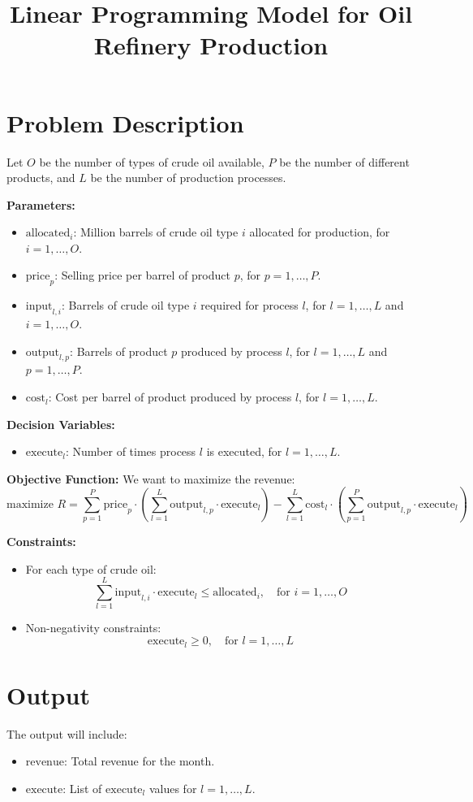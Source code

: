 \documentclass{article}
\begin{document}
\title{Linear Programming Model for Oil Refinery Production}
\author{}
\date{}
\maketitle

\section*{Problem Description}

Let \( O \) be the number of types of crude oil available, \( P \) be the number of different products, and \( L \) be the number of production processes.

\textbf{Parameters:}
\begin{itemize}
    \item \( \text{allocated}_i \): Million barrels of crude oil type \( i \) allocated for production, for \( i = 1, \ldots, O \).
    \item \( \text{price}_p \): Selling price per barrel of product \( p \), for \( p = 1, \ldots, P \).
    \item \( \text{input}_{l,i} \): Barrels of crude oil type \( i \) required for process \( l \), for \( l = 1, \ldots, L \) and \( i = 1, \ldots, O \).
    \item \( \text{output}_{l,p} \): Barrels of product \( p \) produced by process \( l \), for \( l = 1, \ldots, L \) and \( p = 1, \ldots, P \).
    \item \( \text{cost}_l \): Cost per barrel of product produced by process \( l \), for \( l = 1, \ldots, L \).
\end{itemize}

\textbf{Decision Variables:}
\begin{itemize}
    \item \( \text{execute}_l \): Number of times process \( l \) is executed, for \( l = 1, \ldots, L \).
\end{itemize}

\textbf{Objective Function:}
We want to maximize the revenue:
\[
\text{maximize } R = \sum_{p=1}^{P} \text{price}_p \cdot \left( \sum_{l=1}^{L} \text{output}_{l,p} \cdot \text{execute}_l \right) - \sum_{l=1}^{L} \text{cost}_l \cdot \left( \sum_{p=1}^{P} \text{output}_{l,p} \cdot \text{execute}_l \right)
\]

\textbf{Constraints:}
\begin{itemize}
    \item For each type of crude oil:
    \[
    \sum_{l=1}^{L} \text{input}_{l,i} \cdot \text{execute}_l \leq \text{allocated}_i, \quad \text{for } i = 1, \ldots, O
    \]
    \item Non-negativity constraints:
    \[
    \text{execute}_l \geq 0, \quad \text{for } l = 1, \ldots, L
    \]
\end{itemize}

\section*{Output}
The output will include:
\begin{itemize}
    \item \( \text{revenue} \): Total revenue for the month.
    \item \( \text{execute} \): List of \( \text{execute}_l \) values for \( l = 1, \ldots, L \).
\end{itemize}
\end{document}
